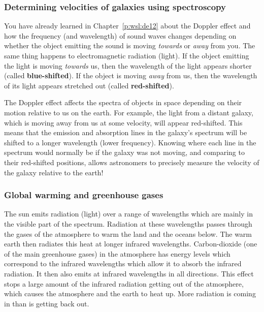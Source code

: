 
\subsubsection{Determining velocities of galaxies using spectroscopy}
You have already learned in Chapter~\ref{p:wsl:de12} about the Doppler effect and how the frequency (and wavelength) of sound waves changes depending on whether the object emitting the sound is moving \textit{towards} or \textit{away} from you. The same thing happens to electromagnetic radiation (light). If the object emitting the light is moving \textit{towards} us, then the wavelength of the light appears shorter (called \textbf{blue-shifted}). If the object is moving \textit{away} from us, then the wavelength of its light appears stretched out (called \textbf{red-shifted}). 

The Doppler effect affects the spectra of objects in space depending on their motion relative to us on the earth. For example, the light from a distant galaxy, which is moving away from us at some velocity, will appear red-shifted. This means that the emission and absorption lines in the galaxy's spectrum will be shifted to a longer wavelength (lower frequency). Knowing where each line in the spectrum would normally be if the galaxy was not moving, and comparing to their red-shifted positions, allows astronomers to precisely measure the velocity of the galaxy relative to the earth!



\subsubsection{Global warming and greenhouse gases}
The sun emits radiation (light) over a range of wavelengths which are mainly in the visible part of the spectrum. Radiation at these wavelengths passes through the gases of the atmosphere to warm the land and the oceans below. The warm earth then radiates this heat at longer infrared wavelengths. Carbon-dioxide (one of the main greenhouse gases) in the atmosphere has energy levels which correspond to the infrared wavelengths which allow it to absorb the infrared radiation. It then also emits at infrared wavelengths in all directions. This effect stops a large amount of the infrared radiation getting out of the atmosphere, which causes the atmosphere and the earth to heat up. More radiation is coming in than is getting back out.    

